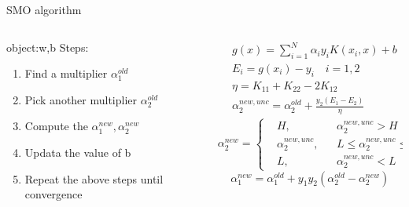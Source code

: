 \documentclass[10pt]{beamer}
\begin{document}
\begin{frame}{SMO algorithm}
 \begin{columns}
             \begin{column}{0.5\textwidth}
object:w,b
Steps:
\begin{enumerate}
    \item Find a multiplier $\alpha_1^{old}$ 
    \item Pick another multiplier $\alpha_2^{old}$
    \item Compute the $\alpha_1^{new},\alpha_2^{new}$
    \item Updata the value of b
    \item Repeat the above steps until convergence
\end{enumerate}

           \end{column}
        \begin{column}{0.5\textwidth}  %
    \begin{equation} \nonumber
    \begin{aligned}
    &g(x) = \sum_{i=1}^{N}\alpha_iy_iK(x_i,x)+b \\
 &E_i = g(x_i)-y_i \quad i = 1,2 \\
&\eta = K_{11}+K_{22}-2K_{12} \\
&\alpha_2^{new,unc}= \alpha_2^{old}+\frac{y_2(E_1-E_2)}{\eta}
    \end{aligned}
\end{equation}
 \begin{equation} \nonumber
    \alpha_2^{new}=\left\{
\begin{aligned}
&H,  &&\alpha_2^{new,unc}>H\\
&\alpha_2^{new,unc}, &&L\leq \alpha_2^{new,unc}\leq H\\
&L, &&\alpha_2^{new,unc}<L
\end{aligned}
\right.
\end{equation}
\begin{equation} \nonumber
\alpha_1^{new} =    \alpha_1^{old}+y_1y_2(\alpha_2^{old}-\alpha_2^{new})
\end{equation}
        \end{column}
    \end{columns}
\end{frame}
\end{document}
